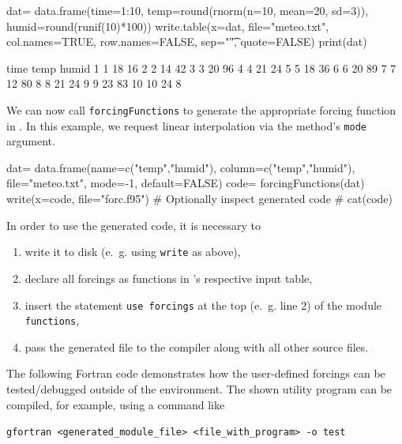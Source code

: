 \documentclass[times,onecolumn]{article}
\begin{document}
\begin{Schunk}
\begin{Sinput}
 dat= data.frame(time=1:10, temp=round(rnorm(n=10, mean=20, sd=3)),
   humid=round(runif(10)*100))
 write.table(x=dat, file="meteo.txt", col.names=TRUE,
   row.names=FALSE, sep="\t", quote=FALSE)
 print(dat)
\end{Sinput}
\begin{Soutput}
   time temp humid
1     1   18    16
2     2   14    42
3     3   20    96
4     4   21    24
5     5   18    36
6     6   20    89
7     7   12    80
8     8   21    24
9     9   23    83
10   10   24     8
\end{Soutput}
\end{Schunk}

We can now call \verb|forcingFunctions| to generate the  appropriate forcing function in . In this example, we request linear interpolation via the method's \verb|mode| argument.

\begin{Schunk}
\begin{Sinput}
 dat= data.frame(name=c("temp","humid"),
   column=c("temp","humid"), file="meteo.txt", mode=-1, default=FALSE)
 code= forcingFunctions(dat)
 write(x=code, file="forc.f95")
 # Optionally inspect generated code
 # cat(code)
\end{Sinput}
\end{Schunk}

In order to use the generated code, it is necessary to
\begin{enumerate}
\item write it to disk (e.~g. using \verb|write| as above),
\item declare all forcings as functions in 's respective input table,
\item insert the statement \verb|use forcings| at the top (e.~g. line 2) of the  module \verb|functions|,
\item pass the generated file to the compiler along with all other  source files.
\end{enumerate}

The following Fortran code demonstrates how the user-defined forcings can be tested/debugged outside of the  environment. The shown utility program can be compiled, for example, using a command like

\medskip
\verb|gfortran <generated_module_file> <file_with_program> -o test|
\end{document}
